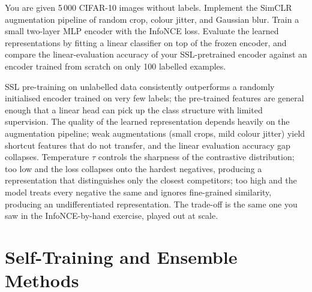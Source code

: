 \vspace{2.5em}



You are given 5\,000 CIFAR-10 images without labels.
Implement the SimCLR augmentation pipeline of random crop, colour jitter, and Gaussian blur.
Train a small two-layer MLP encoder with the InfoNCE loss.
Evaluate the learned representations by fitting a linear classifier on top of the frozen encoder, and compare the linear-evaluation accuracy of your SSL-pretrained encoder against an encoder trained from scratch on only 100 labelled examples.

SSL pre-training on unlabelled data consistently outperforms a randomly initialised encoder trained on very few labels; the pre-trained features are general enough that a linear head can pick up the class structure with limited supervision.
The quality of the learned representation depends heavily on the augmentation pipeline; weak augmentations (small crops, mild colour jitter) yield shortcut features that do not transfer, and the linear evaluation accuracy gap collapses.
Temperature $\tau$ controls the sharpness of the contrastive distribution; too low and the loss collapses onto the hardest negatives, producing a representation that distinguishes only the closest competitors; too high and the model treats every negative the same and ignores fine-grained similarity, producing an undifferentiated representation.
The trade-off is the same one you saw in the InfoNCE-by-hand exercise, played out at scale.







\chapter{Self-Training and Ensemble Methods}

